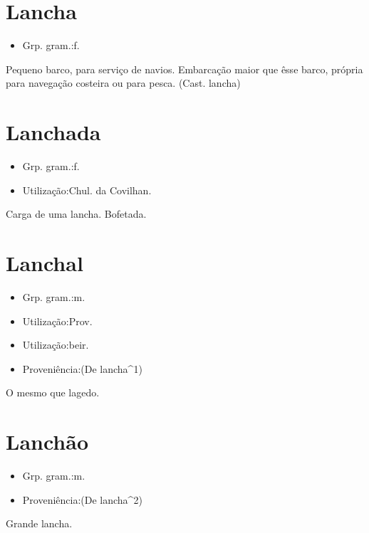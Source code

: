 \section{Lancha}
\begin{itemize}
\item {Grp. gram.:f.}
\end{itemize}
Pequeno barco, para serviço de navios.
Embarcação maior que êsse barco, própria para navegação costeira ou para pesca.
(Cast. \textunderscore lancha\textunderscore )
\section{Lanchada}
\begin{itemize}
\item {Grp. gram.:f.}
\end{itemize}
\begin{itemize}
\item {Utilização:Chul. da Covilhan.}
\end{itemize}
Carga de uma lancha.
Bofetada.
\section{Lanchal}
\begin{itemize}
\item {Grp. gram.:m.}
\end{itemize}
\begin{itemize}
\item {Utilização:Prov.}
\end{itemize}
\begin{itemize}
\item {Utilização:beir.}
\end{itemize}
\begin{itemize}
\item {Proveniência:(De \textunderscore lancha\textunderscore ^1)}
\end{itemize}
O mesmo que \textunderscore lagedo\textunderscore .
\section{Lanchão}
\begin{itemize}
\item {Grp. gram.:m.}
\end{itemize}
\begin{itemize}
\item {Proveniência:(De \textunderscore lancha\textunderscore ^2)}
\end{itemize}
Grande lancha.

